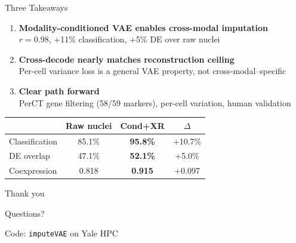 \documentclass[aspectratio=169, 12pt]{beamer}
\begin{document}
\begin{frame}{Three Takeaways}
\begin{enumerate}
    \item \textbf{Modality-conditioned VAE enables cross-modal imputation}\\
    {\small $r = 0.98$, +11\% classification, +5\% DE over raw nuclei}

    \vspace{0.5em}
    \item \textbf{Cross-decode nearly matches reconstruction ceiling}\\
    {\small Per-cell variance loss is a general VAE property, not cross-modal--specific}

    \vspace{0.5em}
    \item \textbf{Clear path forward}\\
    {\small PerCT gene filtering (58/59 markers), per-cell variation, human validation}
\end{enumerate}

\vspace{0.8em}
\centering
{\small
\begin{tabular}{lccc}
\toprule
& \textbf{Raw nuclei} & \textbf{Cond+XR} & \textbf{$\Delta$} \\
\midrule
Classification & 85.1\% & \textbf{95.8\%} & +10.7\% \\
DE overlap & 47.1\% & \textbf{52.1\%} & +5.0\% \\
Coexpression & 0.818 & \textbf{0.915} & +0.097 \\
\bottomrule
\end{tabular}
}
\end{frame}

\begin{frame}[plain]
\centering
\vspace{2cm}
{\Huge\color{mainblue} Thank you}

\vspace{1em}
{\large Questions?}

\vspace{2em}
{\small Code: \texttt{imputeVAE} on Yale HPC}
\end{frame}
\end{document}
